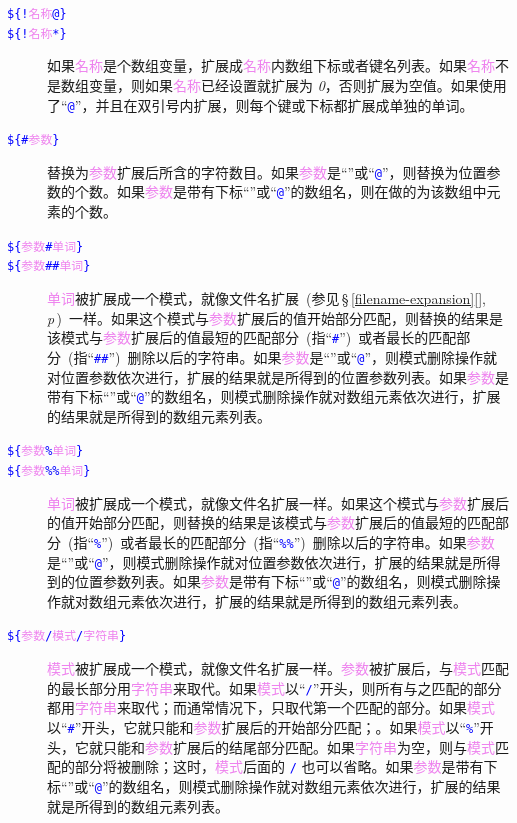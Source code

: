 \documentclass[openany,notitlepage]{book}
\newcommand{\code}[1]{\textcolor{blue}{{\tt #1}}}
\newcommand{\hl}[1]{{\sl #1}}
\newcommand{\hs}[1]{{\textcolor{violet}{#1}}}
\newcommand{\fullref}[1]{\,\S\,\ref{#1}[\nameref{#1}], \textit{p\pageref{#1}}\,}
\begin{document}
\begin{CJK}{UTF8}{song}
\begin{description}
    \item[\code{\$\{!\hs{名称}@\}}]
    \item[\code{\$\{!\hs{名称}*\}}]
    如果\hs{名称}是个数组变量，扩展成\hs{名称}内数组下标或者键名列表。如果\hs{名称}不是数组变量，则如果\hs{名称}已经设置就扩展为 \hl{0}，否则扩展为空值。如果使用了``\code{@}''，并且在双引号内扩展，则每个键或下标都扩展成单独的单词。

    \item[\code{\$\{\#\hs{参数}\}}]
    替换为\hs{参数}扩展后所含的字符数目。如果\hs{参数}是``\code{*}''或``\code{@}''，则替换为位置参数的个数。如果\hs{参数}是带有下标``\code{*}''或``\code{@}''的数组名，则在做的为该数组中元素的个数。

    \item[\code{\$\{\hs{参数}\#\hs{单词}\}}]
    \item[\code{\$\{\hs{参数}\#\#\hs{单词}\}}]
    \hs{单词}被扩展成一个模式，就像文件名扩展~(参见\fullref{filename-expansion})~一样。如果这个模式与\hs{参数}扩展后的值开始部分匹配，则替换的结果是该模式与\hs{参数}扩展后的值最短的匹配部分~(指``\code{\#}'')~或者最长的匹配部分~(指``\code{\#\#}'')~删除以后的字符串。如果\hs{参数}是``\code{*}''或``\code{@}''，则模式删除操作就对位置参数依次进行，扩展的结果就是所得到的位置参数列表。如果\hs{参数}是带有下标``\code{*}''或``\code{@}''的数组名，则模式删除操作就对数组元素依次进行，扩展的结果就是所得到的数组元素列表。

    \item[\code{\$\{\hs{参数}\%\hs{单词}\}}]
    \item[\code{\$\{\hs{参数}\%\%\hs{单词}\}}]
    \hs{单词}被扩展成一个模式，就像文件名扩展一样。如果这个模式与\hs{参数}扩展后的值开始部分匹配，则替换的结果是该模式与\hs{参数}扩展后的值最短的匹配部分~(指``\code{\%}'')~或者最长的匹配部分~(指``\code{\%\%}'')~删除以后的字符串。如果\hs{参数}是``\code{*}''或``\code{@}''，则模式删除操作就对位置参数依次进行，扩展的结果就是所得到的位置参数列表。如果\hs{参数}是带有下标``\code{*}''或``\code{@}''的数组名，则模式删除操作就对数组元素依次进行，扩展的结果就是所得到的数组元素列表。

    \item[\code{\$\{\hs{参数}/\hs{模式}/\hs{字符串}\}}]
    \hs{模式}被扩展成一个模式，就像文件名扩展一样。\hs{参数}被扩展后，与\hs{模式}匹配的最长部分用\hs{字符串}来取代。如果\hs{模式}以``\code{/}''开头，则所有与之匹配的部分都用\hs{字符串}来取代；而通常情况下，只取代第一个匹配的部分。如果\hs{模式}以``\code{\#}''开头，它就只能和\hs{参数}扩展后的开始部分匹配；。如果\hs{模式}以``\code{\%}''开头，它就只能和\hs{参数}扩展后的结尾部分匹配。如果\hs{字符串}为空，则与\hs{模式}匹配的部分将被删除；这时，\hs{模式}后面的 \code{/} 也可以省略。如果\hs{参数}是带有下标``\code{*}''或``\code{@}''的数组名，则模式删除操作就对数组元素依次进行，扩展的结果就是所得到的数组元素列表。


\end{description}
\end{CJK}
\end{document}

